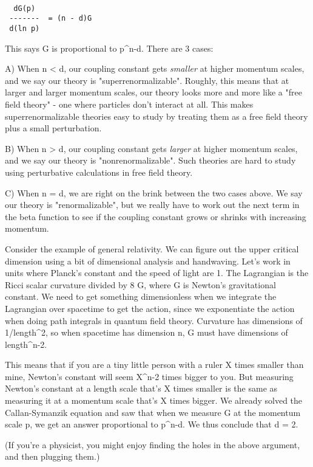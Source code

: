 \begin{verbatim}

  dG(p) 
 -------  = (n - d)G
 d(ln p)
\end{verbatim}
    
This says G is proportional to p^{n-d}.  There are 3 cases:


A) When n < d, our coupling constant gets \emph{smaller} at higher
momentum scales, and we say our theory is
"superrenormalizable".  Roughly, this means that at larger and
larger momentum scales, our theory looks more and more like a "free
field theory" - one where particles don't interact at all.  This
makes superrenormalizable theories easy to study by treating them as a
free field theory plus a small perturbation.


 B) When n > d, our coupling constant gets \emph{larger} at
higher momentum scales, and we say our theory is
"nonrenormalizable".  Such theories are hard to study using
perturbative calculations in free field theory.

C)  When n = d, we are right on the brink between the two cases above.
We say our theory is "renormalizable", but we really have to work out
the next term in the beta function to see if the coupling constant
grows or shrinks with increasing momentum.

Consider the example of general relativity.  We can figure out
the upper critical dimension using a bit of dimensional analysis
and handwaving.  Let's work in units where Planck's constant and the 
speed of light are 1.  The Lagrangian is the Ricci scalar curvature 
divided by 8 \pi  G, where G is Newton's gravitational constant.  We 
need to get something dimensionless when we integrate the Lagrangian 
over spacetime to get the action, since we exponentiate the action 
when doing path integrals in quantum field theory.  Curvature has 
dimensions of 1/length^{2}, so when spacetime has dimension n, G must 
have dimensions of length^{n-2}.  

This means that if you are a tiny little person with a ruler X 
times smaller than mine, Newton's constant will seem X^{n-2} times 
bigger to you.  But measuring Newton's constant at a length scale 
that's X times smaller is the same as measuring it at a momentum scale 
that's X times bigger.  We already solved the Callan-Symanzik equation 
and saw that when we measure G at the momentum scale p, we get an
answer proportional to p^{n-d}.  We thus conclude that d = 2.  

(If you're a physicist, you might enjoy finding the holes in the
above argument, and then plugging them.)  

